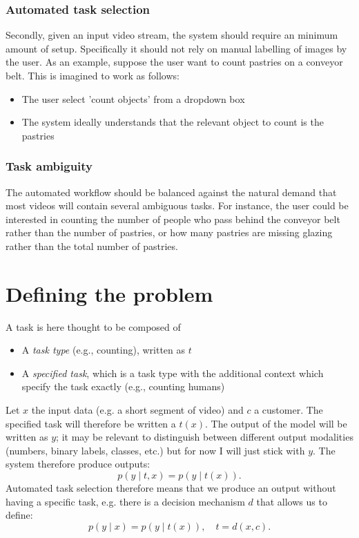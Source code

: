 \documentclass{article}
\begin{document}
\subsubsection{Automated task selection}
Secondly, given an input video stream, the system should require an minimum amount of setup. Specifically it should not rely on manual labelling of images by the user. As an example, suppose the user want to count pastries on a conveyor belt. This is imagined to work as follows:
\begin{itemize}
    \item The user select 'count objects' from a dropdown box
    \item The system ideally understands that the relevant object to count is the pastries
\end{itemize}

\subsubsection{Task ambiguity} 
The automated workflow should be balanced against the natural demand that most videos will contain several ambiguous tasks. For instance, the user could be interested in counting the number of people who pass behind the conveyor belt rather than the number of pastries, or how many pastries are missing glazing rather than the total number of pastries.

\section{Defining the problem}
A task is here thought to be composed of 
\begin{itemize}
    \item A \emph{task type} (e.g., counting), written as $t$
    \item A \emph{specified task}, which is a task type with the additional context which specify the task exactly (e.g., counting humans)
\end{itemize}
Let $x$ the input data (e.g. a short segment of video) and $c$ a customer. The specified task will therefore be written a $t(x)$. The output of the model will be written as $y$; it may be relevant to distinguish between different output modalities (numbers, binary labels, classes, etc.) but for now I will just stick with $y$. The system therefore produce outputs:
$$
p(y \mid t, x) = p(y \mid t(x)).
$$
Automated task selection therefore means that we produce an output without having a specific task, e.g. there is a decision mechanism $d$ that allows us to define: 
$$
p(y \mid x) = p(y \mid t(x)), \quad t = d(x, c).
$$
\end{document}
